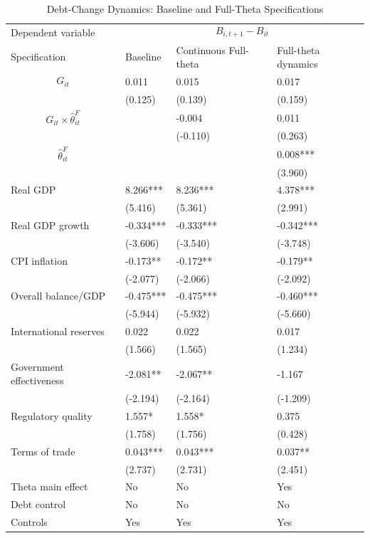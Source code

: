 \begin{table}[H]\centering
\begin{threeparttable}
\caption{Debt-Change Dynamics: Baseline and Full-Theta Specifications}
\label{tab:debt_change_combined_fulltheta}
\scriptsize
\begin{tabularx}{\textwidth}{lYYY}
\toprule
Dependent variable &  \\
\cmidrule(lr){2-4}
Specification & Baseline & Continuous Full-theta & Full-theta dynamics \\
\midrule
$$G_{it}$$ & 0.011 & 0.015 & 0.017 \\
 & (0.125) & (0.139) & (0.159) \\
$$G_{it}\times\widehat{\theta}^{F}_{it}$$ &  & -0.004 & 0.011 \\
 &  & (-0.110) & (0.263) \\
$$\widehat{\theta}^{F}_{it}$$ &  &  & 0.008*** \\
 &  &  & (3.960) \\
Real GDP & 8.266*** & 8.236*** & 4.378*** \\
 & (5.416) & (5.361) & (2.991) \\
Real GDP growth & -0.334*** & -0.333*** & -0.342*** \\
 & (-3.606) & (-3.540) & (-3.748) \\
CPI inflation & -0.173** & -0.172** & -0.179** \\
 & (-2.077) & (-2.066) & (-2.092) \\
Overall balance/GDP & -0.475*** & -0.475*** & -0.460*** \\
 & (-5.944) & (-5.932) & (-5.660) \\
International reserves & 0.022 & 0.022 & 0.017 \\
 & (1.566) & (1.565) & (1.234) \\
Government effectiveness & -2.081** & -2.067** & -1.167 \\
 & (-2.194) & (-2.164) & (-1.209) \\
Regulatory quality & 1.557* & 1.558* & 0.375 \\
 & (1.758) & (1.756) & (0.428) \\
Terms of trade & 0.043*** & 0.043*** & 0.037** \\
 & (2.737) & (2.731) & (2.451) \\
\midrule
Theta main effect & No & No & Yes \\
Debt control & No & No & No \\
Controls & Yes & Yes & Yes \\

\end{tabularx}
\end{threeparttable}
\end{table}
